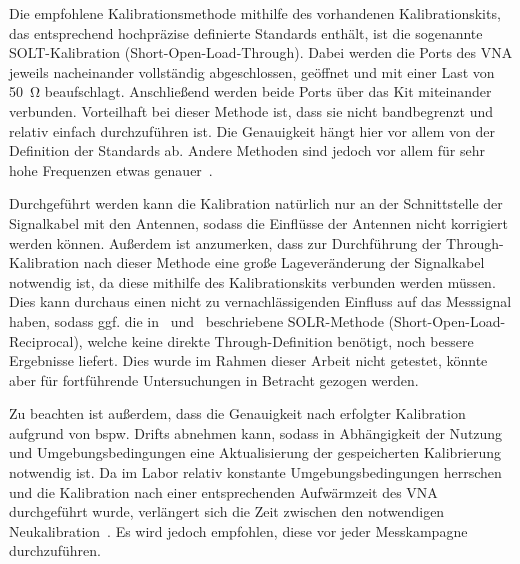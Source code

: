 Die empfohlene Kalibrationsmethode mithilfe des vorhandenen Kalibrationskits, das entsprechend hochpräzise definierte Standards enthält, ist die sogenannte SOLT-Kalibration (Short-Open-Load-Through). Dabei werden die Ports des VNA jeweils nacheinander vollständig abgeschlossen, geöffnet und mit einer Last von \SI{50}{\ohm} beaufschlagt. Anschließend werden beide Ports über das Kit miteinander verbunden. Vorteilhaft bei dieser Methode ist, dass sie nicht bandbegrenzt und relativ einfach durchzuführen ist. Die Genauigkeit hängt hier vor allem von der Definition der Standards ab. Andere Methoden sind jedoch vor allem für sehr hohe Frequenzen etwas genauer~\cite{VNA-Calibration_Application_Note}. 
\par
\vspace{\linespace}
Durchgeführt werden kann die Kalibration natürlich nur an der Schnittstelle der Signalkabel mit den Antennen, sodass die Einflüsse der Antennen nicht korrigiert werden können. Außerdem ist anzumerken, dass zur Durchführung der \glqq Through\grqq-Kalibration nach dieser Methode eine große Lageveränderung der Signalkabel notwendig ist, da diese mithilfe des Kalibrationskits verbunden werden müssen. Dies kann durchaus einen nicht zu vernachlässigenden Einfluss auf das Messsignal haben, sodass ggf. die in~\cite{VNA-Calibration_Application_Note} und~\cite{VNA-Handbuch} beschriebene SOLR-Methode (Short-Open-Load-Reciprocal), welche keine direkte \glqq Through\grqq-Definition benötigt, noch bessere Ergebnisse liefert. Dies wurde im Rahmen dieser Arbeit nicht getestet, könnte aber für fortführende Untersuchungen in Betracht gezogen werden.
\par
\vspace{\linespace}
Zu beachten ist außerdem, dass die Genauigkeit nach erfolgter Kalibration aufgrund von bspw. Drifts abnehmen kann, sodass in Abhängigkeit der Nutzung und Umgebungsbedingungen eine Aktualisierung der gespeicherten Kalibrierung notwendig ist. Da im Labor relativ konstante Umgebungsbedingungen herrschen und die Kalibration nach einer entsprechenden Aufwärmzeit des VNA durchgeführt wurde, verlängert sich die Zeit zwischen den notwendigen Neukalibration~\cite{VNA-Handbuch, VNA_Error_Models_and_Calibration_Methods}. Es wird jedoch empfohlen, diese vor jeder Messkampagne durchzuführen.









